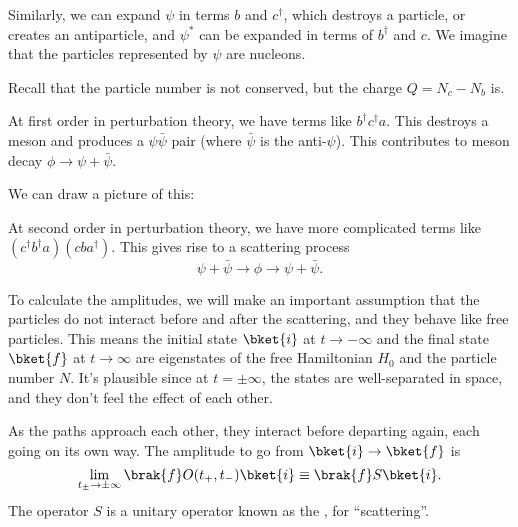 \documentclass[a4paper]{article}
\begin{document}
Similarly, we can expand $\psi$ in terms $b$ and $c^\dagger$, which destroys a particle, or creates an antiparticle, and $\psi^*$ can be expanded in terms of $b^\dagger$ and $c$. We imagine that the particles represented by $\psi$ are nucleons.

Recall that the particle number is not conserved, but the charge $Q = N_c - N_b$ is.

At first order in perturbation theory, we have terms like $b^\dagger c^\dagger a$. This destroys a meson and produces a $\psi \bar{\psi}$ pair (where $\bar{\psi}$ is the anti-$\psi$). This contributes to meson decay $\phi \to \psi + \bar{\psi}$.

We can draw a picture of this:
\begin{center}
\end{center}
At second order in perturbation theory, we have more complicated terms like $(c^\dagger b^\dagger a)(cba^\dagger)$. This gives rise to a scattering process
\[
  \psi + \bar{\psi} \to \phi \to \psi + \bar{\psi}.
\]
\begin{center}
\end{center}
To calculate the amplitudes, we will make an important assumption that the particles do not interact before and after the scattering, and they behave like free particles. This means the initial state $\bket{i}$ at $t \to -\infty$ and the final state $\bket{f}$ at $t \to \infty$ are eigenstates of the free Hamiltonian $H_0$ and the particle number $N$. It's plausible since at $t = \pm \infty$, the states are well-separated in space, and they don't feel the effect of each other.

As the paths approach each other, they interact before departing again, each going on its own way. The amplitude to go from $\bket{i} \to \bket{f}$ is
\[
  \lim_{t_{\pm} \to \pm \infty} \brak{f} O(t_+, t_-) \bket{i} \equiv \brak{f}S\bket{i}.
\]
The operator $S$ is a unitary operator known as the , for ``scattering''.
\end{document}
